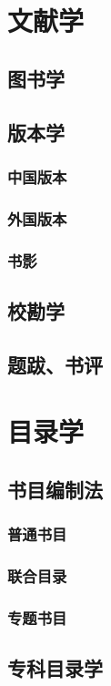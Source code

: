 \documentclass[UTF8]{../../ApplicationUniverse}
\begin{document}
\section{文献学}
\subsection{图书学}
\subsection{版本学}
    \subsubsection{中国版本}
    \subsubsection{外国版本}
    \subsubsection{书影}
\subsection{校勘学}
\subsection{题跋、书评}


\section{目录学}
\subsection{书目编制法}
    \subsubsection{普通书目}
    \subsubsection{联合目录}
    \subsubsection{专题书目}
\subsection{专科目录学}
\end{document}
